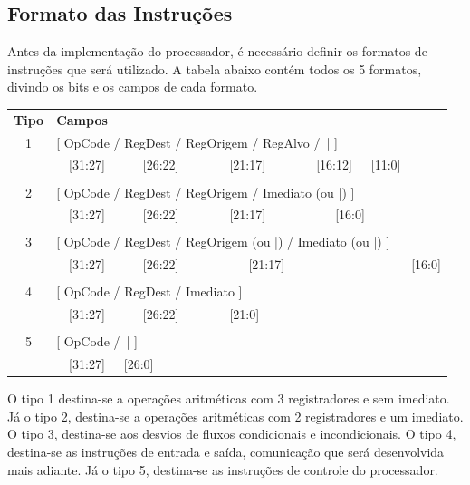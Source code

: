 \documentclass[a4paper, 12pt]{article}
\begin{document}
\subsection{Formato das Instruções}
Antes da implementação do processador, é necessário definir os formatos de instruções que será utilizado. A tabela abaixo contém todos os 5 formatos, divindo os bits e os campos de cada formato.
\begin{center}
\begin{tabular}{ cl }
 	\textbf{Tipo} & \textbf{Campos}\\
 	1 & [ OpCode / RegDest / RegOrigem / RegAlvo /\ | ]\\
 	  &  \ \ [31:27]\ \ \ \ \ \ [26:22]\ \ \ \ \ \ \ \ [21:17]\ \ \ \ \ \ \ \ [16:12]\ \ \ [11:0]\\
 	\hline
 	\\
 	2 & [ OpCode / RegDest / RegOrigem / Imediato (ou |) ]\\
 	  &  \ \ [31:27]\ \ \ \ \ \ [26:22]\ \ \ \ \ \ \ \ [21:17]\ \ \ \ \ \ \ \ \ \ \ [16:0]\\
 	\hline
 	\\
 	3 & [ OpCode / RegDest / RegOrigem (ou |) / Imediato (ou |) ]\\
 	  &  \ \ [31:27]\ \ \ \ \ \ [26:22]\ \ \ \ \ \ \ \ \ \ \ [21:17]\ \ \ \ \ \ \ \ \ \ \ \ \ \ \ \ \ \ \ \ [16:0]\\
 	\hline
 	\\
 	4 & [ OpCode / RegDest / Imediato ]\\
 	  &  \ \ [31:27]\ \ \ \ \ \ [26:22]\ \ \ \ \ \ \ \ [21:0]\\
 	\hline
 	\\
 	5 & [ OpCode /\ | ]\\
 	  &  \ \ [31:27]\ \ \  [26:0]\\
 	\hline
  \end{tabular}
 \end{center}
  
O tipo 1 destina-se a operações aritméticas com 3 registradores e sem imediato. Já o tipo 2, destina-se a operações aritméticas com 2 registradores e um imediato. O tipo 3, destina-se aos desvios de fluxos condicionais e incondicionais. O tipo 4, destina-se as instruções de entrada e saída, comunicação que será desenvolvida mais adiante. Já o tipo 5, destina-se as instruções de controle do processador.
\end{document}
